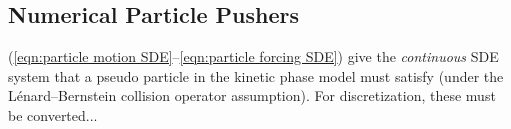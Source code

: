 \subsection{Numerical Particle Pushers}

    (\ref{eqn:particle motion SDE}--\ref{eqn:particle forcing SDE}) give the \emph{continuous} SDE system that a pseudo particle in the kinetic phase model must satisfy (under the Lénard--Bernstein collision operator assumption). For discretization, these must be converted...


    
    
